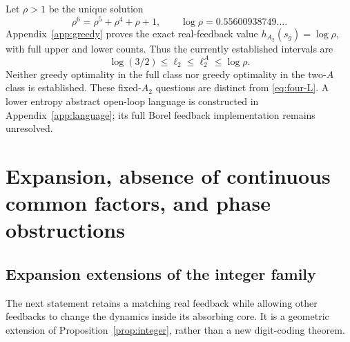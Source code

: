\documentclass[11pt,reqno]{amsart}
\numberwithin{equation}{section}
\theoremstyle{definition}
\begin{document}
Let $\rho>1$ be the unique solution
\begin{equation}\label{eq:rho}
 \rho^6=\rho^5+\rho^4+\rho+1,
 \qquad\log\rho=0.55600938749\ldots.
\end{equation}
Appendix~\ref{app:greedy} proves the exact real-feedback value
$h_{A_2}(s_g)=\log\rho$, with full upper and lower counts.
Thus the currently established intervals are
\begin{equation}\label{eq:four-even}
 \log(3/2)\le\ell_2\le\ell_2^A\le\log\rho.
\end{equation}
Neither greedy optimality in the full class nor greedy optimality
in the two-$A$ class is established. These fixed-$A_2$ questions
are distinct from \eqref{eq:four-L}. A lower entropy abstract
open-loop language is constructed in Appendix~\ref{app:language};
its full Borel feedback implementation remains unresolved.


\section{Expansion, absence of continuous common factors, and phase obstructions}
\label{sec:extensions}

\subsection{Expansion extensions of the integer family}
The next statement retains a matching real feedback while allowing other
feedbacks to change the dynamics inside its absorbing core. It is a
geometric extension of Proposition~\ref{prop:integer}, rather than a
new digit-coding theorem.
\end{document}
